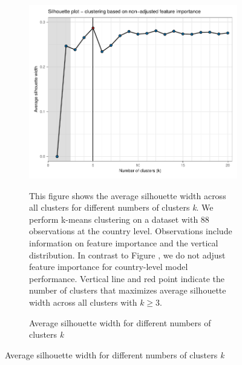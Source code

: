 \begin{figure}[ht!]\ContinuedFloat
   \centering
   \begin{subfigure}[b]{\textwidth}
   \centering
   \includegraphics{Figures_Appendix/Figure_Silhouette_1.pdf}
   \caption{Average silhouette width for different numbers of clusters \textit{k}} \label{fig:G1_silhouette}
   \begin{subcaption2}
     This figure shows the average silhouette width across all clusters for different numbers of clusters \textit{k}. We perform k-means clustering on a dataset with 88 observations at the country level. Observations include information on feature importance and the vertical distribution. In contrast to Figure , we do not adjust feature importance for country-level model performance. Vertical line and red point indicate the number of clusters that maximizes average silhouette width across all clusters with $k \geq 3$.
   \end{subcaption2}
   \end{subfigure}
 \end{figure}

 \clearpage

